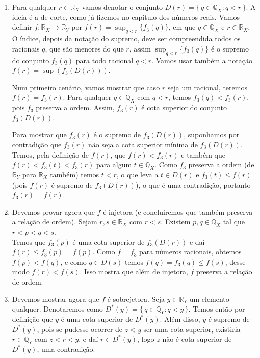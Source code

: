 \documentclass[../main.tex]{subfiles}
\begin{document}
\begin{dem}
\begin{enumerate}
        \begin{enumerate}
            \item Para qualquer $r \in \mathbb{R}_X$ vamos denotar o conjunto $D(r) = \{\,q \in \mathbb{Q}_X : q < r \,\} $. A ideia é a de corte, como já fizemos no capítulo dos números reais.
            Vamos definir $f \colon \mathbb{R}_X \to \mathbb{R}_Y$ por $f(r) = \sup_{q < r} \{f_3(q)\} $, em que $q \in \mathbb{Q}_X$ e $r \in \mathbb{R}_X$. O índice, depois da notação do supremo, deve ser compreendida todos os racionais $q$, que são menores do que $r$, assim $\sup_{q<r}\{f_3(q)\}$ é o supremo do conjunto $f_3(q)$ para todo racional $q < r$. Vamos usar também a notação $f(r) = \sup(f_3(D(r)))$.

            Num primeiro cenário, vamos mostrar que caso $r$ seja um racional, teremos $f(r) = f_3(r)$.
            Para qualquer $q \in \mathbb{Q}_X$ com $q < r$, temos $f_3(q) < f_3(r)$, pois $f_3$ preserva a ordem. Assim, $f_3(r)$ é cota superior do conjunto $f_3(D(r))$.

            Para mostrar que $f_3(r)$ é o supremo de $f_3(D(r))$, suponhamos por contradição que $f_3(r)$ não seja a cota superior mínima de $f_3(D(r))$. Temos, pela definição de $f(r)$, que $f(r) < f_3(r)$ e também que $f(r) < f_3(t) < f_3(r)$ para algum $t \in \mathbb{Q}_X$. Como $f_3$ preserva a ordem (de $\mathbb{R}_Y$ para $\mathbb{R}_X$ também) temos $t < r$, o que leva a 
            $t \in D(r)$ e $f_3(t) \leq f(r)$ (pois $f(r)$ é supremo de $f_3(D(r))$), o que é uma contradição, portanto $f_3(r) = f(r)$.

            \item Devemos provar agora que $f$ é injetora (e concluiremos que também preserva a relação de ordem).
            Sejam $r,s \in \mathbb{R}_X$ com $r < s$. Existem $p,q \in \mathbb{Q}_X$ tal que $r < p < q < s$. \\
            Temos que $f_3(p)$ é uma cota superior de $f_3(D(r))$ e daí $f(r) \leq f_3(p) = f(p)$.
            Como $f=f_3$ para números racionais, obtemos $f(p) < f(q)$, e como $q \in D(s)$ temos $f(q) = f_3(q) \leq f(s)$, desse modo $f(r) < f(s)$. Isso mostra que além de injetora, $f$ preserva a relação de ordem.

            \item Devemos mostrar agora que $f$ é sobrejetora. Seja $y \in \mathbb{R}_Y$ um elemento qualquer.
            Denotaremos como $D^*(y) = \{\,q \in \mathbb{Q}_Y : q < y\,\}$. Temos então por definição que $y$ é uma cota superior de $D^*(y)$. Além disso, $y$ é supremo de $D^*(y)$, pois se pudesse ocorrer de $z < y$ ser uma cota superior, existiria $r \in \mathbb{Q}_Y$ com 
            $z < r < y$, e daí $r \in D^*(y)$, logo $z$ não é cota superior de $D^*(y)$, uma contradição.


\end{enumerate}
\end{enumerate}
\end{dem}
\end{document}
